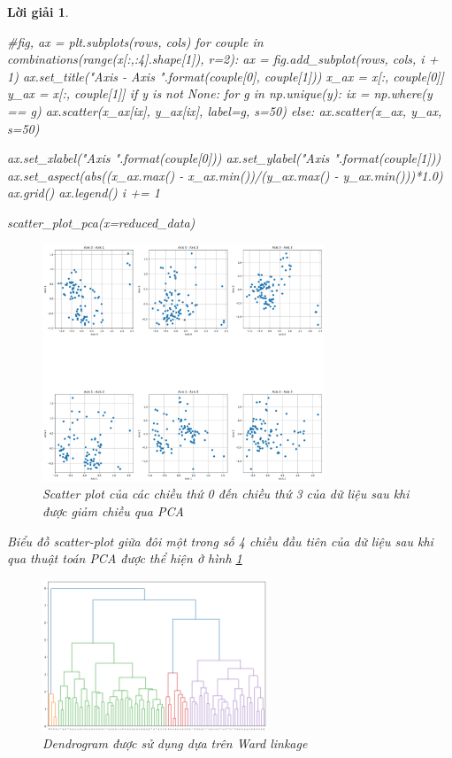 \documentclass[14pt, a4paper]{article}
\theoremstyle{sltheorem}
\theoremstyle{soltheorem}
\newtheorem*{loigiai}{Lời giải}
\begin{document}
\begin{loigiai}
\begin{python}
#fig, ax = plt.subplots(rows, cols)
for couple in combinations(range(x[:,:4].shape[1]), r=2):
    ax = fig.add_subplot(rows, cols, i + 1)
    ax.set_title("Axis {} - Axis {}".format(couple[0], couple[1]))
    x_ax = x[:, couple[0]]
    y_ax = x[:, couple[1]]
    if y is not None:
        for g in np.unique(y):
            ix = np.where(y == g)
            ax.scatter(x_ax[ix], y_ax[ix], label=g, s=50)
    else:
        ax.scatter(x_ax, y_ax, s=50)

    ax.set_xlabel("Axis {}".format(couple[0]))
    ax.set_ylabel("Axis {}".format(couple[1]))
    ax.set_aspect(abs((x_ax.max() - x_ax.min())/(y_ax.max() - y_ax.min()))*1.0)
    ax.grid()
    ax.legend()
    i += 1

scatter_plot_pca(x=reduced_data)
    \end{python}


    \begin{figure}[h!]
        \centering
        \includegraphics[width=0.75\textwidth]{figures/pca_scattering_4_dim.png}
        \caption{Scatter plot của các chiều thứ 0 đến chiều thứ 3 của dữ liệu sau khi được giảm chiều qua PCA}
        \label{fig:pca-scattering-4-dim}
    \end{figure}

    Biểu đồ scatter-plot giữa đôi một trong số 4 chiều đầu tiên của dữ liệu sau khi qua thuật toán PCA được thể hiện ở hình \ref{fig:pca-scattering-4-dim}

    \begin{figure}[h!]
        \centering
        \includegraphics[width=0.6\textwidth]{figures/dendro_ward.png}
        \caption{Dendrogram được sử dụng dựa trên Ward linkage}
        \label{fig:dendro-ward}
    \end{figure}


\end{loigiai}
\end{document}
